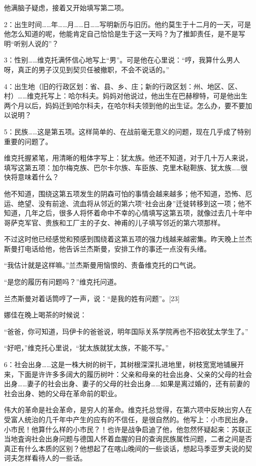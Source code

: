 他满脑子疑虑，接着又开始填写第二项。

2：出生时间……年……月……日……写明新历与旧历。他约莫生于十二月的一天，可是他怎么知道的呢，他能肯定自己恰恰是生于这一天吗？为了推卸责任，是不是写明“听别人说的”？

3：性别……维克托满怀信心地写上“男”。可是他在心里说：“哼，我算什么男人呀，真正的男子汉见到契贝任被撤职，不会不说话的。”

4：出生地（旧的行政区划：省、县、乡、庄；新的行政区划：州、地区、区、村）……维克托写上：哈尔科夫。妈妈对他说过，他出生在巴赫穆特，可是他出生两个月以后，妈妈迁到哈尔科夫，在哈尔科夫领到他的出生证。怎么办，要不要加以说明？

5：民族……这是第五项。这样简单的、在战前毫无意义的问题，现在几乎成了特别重要的问题了。

维克托握紧笔，用清晰的粗体字写上：犹太族。他还不知道，对于几十万人来说，填写这第五项：加尔梅克族、巴尔卡尔族、车臣族、克里木鞑靼族、犹太族……很快将意味着什么？

他不知道，围绕这第五项发生的阴森可怕的事情会越来越多；他不知道，恐怖、厄运、绝望、没有前途、流血将从邻近的第六项“社会出身”迁徙转移到这一项；他不知道，几年之后，很多人将怀着命中不幸的心情填写这第五项，就像过去几十年中哥萨克军官、贵族和工厂主的子女、神甫的儿子填写邻近的第六项那样。

不过这时他已经感觉和预感到围绕着这第五项的强力线越来越密集。昨天晚上兰杰斯曼打电话给他，他告诉兰杰斯曼，安排工作的事还一点没有头绪。

“我估计就是这样嘛。”兰杰斯曼用恼恨的、责备维克托的口气说。

“是您的履历有问题吗？”维克托问道。

兰杰斯曼对着话筒哼了一声，说：“是我的姓有问题”。[23]

娜佳在晚上喝茶的时候说：

“爸爸，你可知道，玛伊卡的爸爸说，明年国际关系学院再也不招收犹太学生了。”

“好吧，”维克托心里说，“犹太族就犹太族，不能不写。”

6：社会出身……这是一株大树的树干，其树根深深扎进地里，树枝宽宽地铺展开来，下面是许许多多阔大的履历树叶：父亲和母亲的社会出身、父亲的父母的社会出身……妻子的社会出身、妻子的父母的社会出身……如果是离过婚的，还有前妻的社会出身、她的父母在革命前的职业。

伟大的革命是社会革命，是穷人的革命。维克托总觉得，在第六项中反映出穷人在受富人统治的几千年中产生的应有的不信任，是很自然的。他写上：小市民出身。小市民！他算什么样的小市民？！也许是战争启迪了他，他忽然怀疑起来：苏联正当地査询社会出身问题与德国人怀着血腥的目的查询民族属性问题，二者之间是否真正有什么本质的区别？他想起了在喀山晚间的一些谈话，想起马季亚罗夫说的契诃夫怎样看待人的一些话。

